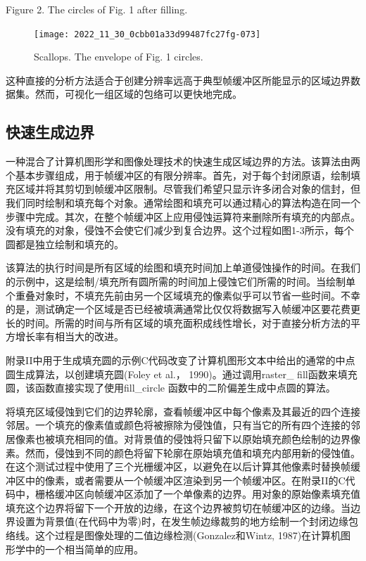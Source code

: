 \begin{CJK}{UTF8}{gbsn}
Figure 2. The circles of Fig. 1 after filling.

\begin{figure}
\begin{center}
\texttt{[image: 2022\_11\_30\_0cbb01a33d99487fc27fg-073]}
\end{center}
\caption{Scallops. The envelope of Fig. 1 circles.}
\end{figure}


这种直接的分析方法适合于创建分辨率远高于典型帧缓冲区所能显示的区域边界数据集。然而，可视化一组区域的包络可以更快地完成。


\subsection*{快速生成边界}
一种混合了计算机图形学和图像处理技术的快速生成区域边界的方法。该算法由两个基本步骤组成，用于帧缓冲区的有限分辨率。首先，对于每个封闭原语，绘制填充区域并将其剪切到帧缓冲区限制。尽管我们希望只显示许多闭合对象的信封，但我们同时绘制和填充每个对象。通常绘图和填充可以通过精心的算法构造在同一个步骤中完成。其次，在整个帧缓冲区上应用侵蚀运算符来删除所有填充的内部点。没有填充的对象，侵蚀不会使它们减少到复合边界。这个过程如图1-3所示，每个圆都是独立绘制和填充的。


该算法的执行时间是所有区域的绘图和填充时间加上单道侵蚀操作的时间。在我们的示例中，这是绘制/填充所有圆所需的时间加上侵蚀它们所需的时间。当绘制单个重叠对象时，不填充先前由另一个区域填充的像素似乎可以节省一些时间。不幸的是，测试确定一个区域是否已经被填满通常比仅仅将数据写入帧缓冲区要花费更长的时间。所需的时间与所有区域的填充面积成线性增长，对于直接分析方法的平方增长率有相当大的改进。

附录II中用于生成填充圆的示例$\mathrm{C}$代码改变了计算机图形文本中给出的通常的中点圆生成算法，以创建填充圆(Foley et al.， 1990)。通过调用raster\_ fill函数来填充圆，该函数直接实现了使用fill\_circle 函数中的二阶偏差生成中点圆的算法。


将填充区域侵蚀到它们的边界轮廓，查看帧缓冲区中每个像素及其最近的四个连接邻居。一个填充的像素值或颜色将被擦除为侵蚀值，只有当它的所有四个连接的邻居像素也被填充相同的值。对背景值的侵蚀将只留下以原始填充颜色绘制的边界像素。然而，侵蚀到不同的颜色将留下轮廓在原始填充值和填充内部用新的侵蚀值。在这个测试过程中使用了三个光栅缓冲区，以避免在以后计算其他像素时替换帧缓冲区中的像素，或者需要从一个帧缓冲区渲染到另一个帧缓冲区。在附录II的$\mathrm{C}$代码中，栅格缓冲区向帧缓冲区添加了一个单像素的边界。用对象的原始像素填充值填充这个边界将留下一个开放的边缘，在这个边界被剪切在帧缓冲区的边缘。当边界设置为背景值(在代码中为零)时，在发生帧边缘裁剪的地方绘制一个封闭边缘包络线。这个过程是图像处理的二值边缘检测(Gonzalez和Wintz, 1987)在计算机图形学中的一个相当简单的应用。


\end{CJK}
